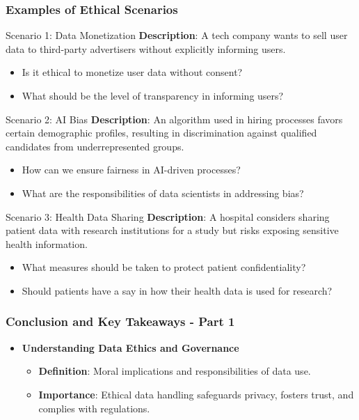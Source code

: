 \documentclass[aspectratio=169]{beamer}
\begin{document}
\begin{frame}[fragile]
    \frametitle{Examples of Ethical Scenarios}

    \begin{block}{Scenario 1: Data Monetization}
        \textbf{Description}: A tech company wants to sell user data to third-party advertisers without explicitly informing users.
        \begin{itemize}
            \item Is it ethical to monetize user data without consent?
            \item What should be the level of transparency in informing users?
        \end{itemize}
    \end{block}

    \begin{block}{Scenario 2: AI Bias}
        \textbf{Description}: An algorithm used in hiring processes favors certain demographic profiles, resulting in discrimination against qualified candidates from underrepresented groups.
        \begin{itemize}
            \item How can we ensure fairness in AI-driven processes?
            \item What are the responsibilities of data scientists in addressing bias?
        \end{itemize}
    \end{block}

    \begin{block}{Scenario 3: Health Data Sharing}
        \textbf{Description}: A hospital considers sharing patient data with research institutions for a study but risks exposing sensitive health information.
        \begin{itemize}
            \item What measures should be taken to protect patient confidentiality?
            \item Should patients have a say in how their health data is used for research?
        \end{itemize}
    \end{block}
\end{frame}

\begin{frame}[fragile]
    \frametitle{Conclusion and Key Takeaways - Part 1}
    \begin{itemize}
        \item \textbf{Understanding Data Ethics and Governance}
            \begin{itemize}
                \item \textbf{Definition}: Moral implications and responsibilities of data use.
                \item \textbf{Importance}: Ethical data handling safeguards privacy, fosters trust, and complies with regulations.
            \end{itemize}
    \end{itemize}
\end{frame}
\end{document}
